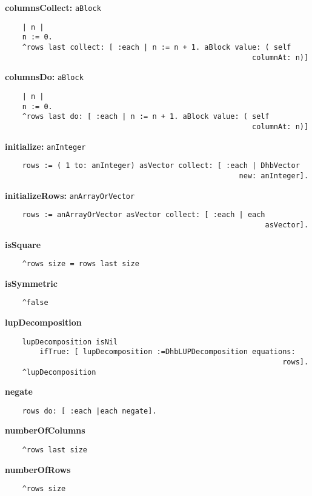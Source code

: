 {\bf columnsCollect:} {\tt aBlock}
\begin{verbatim}
    | n |
    n := 0.
    ^rows last collect: [ :each | n := n + 1. aBlock value: ( self 
                                                         columnAt: n)]

\end{verbatim}
{\bf columnsDo:} {\tt aBlock}
\begin{verbatim}
    | n |
    n := 0.
    ^rows last do: [ :each | n := n + 1. aBlock value: ( self 
                                                         columnAt: n)]

\end{verbatim}
{\bf initialize:} {\tt anInteger}
\begin{verbatim}
    rows := ( 1 to: anInteger) asVector collect: [ :each | DhbVector 
                                                      new: anInteger].

\end{verbatim}
{\bf initializeRows:} {\tt anArrayOrVector}
\begin{verbatim}
    rows := anArrayOrVector asVector collect: [ :each | each 
                                                            asVector].

\end{verbatim}
{\bf isSquare}
\begin{verbatim}
    ^rows size = rows last size

\end{verbatim}
{\bf isSymmetric}
\begin{verbatim}
    ^false

\end{verbatim}
{\bf lupDecomposition}
\begin{verbatim}
    lupDecomposition isNil
        ifTrue: [ lupDecomposition :=DhbLUPDecomposition equations: 
                                                                rows].
    ^lupDecomposition

\end{verbatim}
{\bf negate}
\begin{verbatim}
    rows do: [ :each |each negate].

\end{verbatim}
{\bf numberOfColumns}
\begin{verbatim}
    ^rows last size

\end{verbatim}
{\bf numberOfRows}
\begin{verbatim}
    ^rows size

\end{verbatim}
